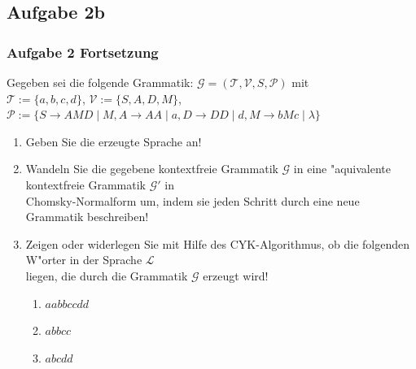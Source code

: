 
\subsection{Aufgabe 2b}
\begin{frame}
	\frametitle{Aufgabe 2 Fortsetzung}
	Gegeben sei die folgende Grammatik: $\mathcal{G} = (\mathcal{T},\mathcal{V},S,
	\mathcal{P})$ mit\\
	$\mathcal{T} := \{a,b,c,d\}$, $\mathcal{V} := \{S,A,D,M\}$, $\mathcal{P} := \{
	S \rightarrow AMD \; | \; M, A \rightarrow AA \; | \; a, D \rightarrow DD \; | \; d,
	M \rightarrow bMc \; | \; \lambda\}$
	\begin{enumerate}
		\item Geben Sie die erzeugte Sprache an!
		\item Wandeln Sie die gegebene kontextfreie Grammatik $\mathcal{G}$ in eine
		"aquivalente kontextfreie Grammatik $\mathcal{G}'$ in\\
		Chomsky-Normalform um, indem sie jeden Schritt durch eine neue Grammatik beschreiben!
		\item Zeigen oder widerlegen Sie mit Hilfe des CYK-Algorithmus, ob die folgenden
		W"orter in der Sprache $\mathcal{L}$\\
		liegen, die durch die Grammatik $\mathcal{G}$ erzeugt wird!
		\begin{enumerate}
			\item $aabbccdd$
			\item $abbcc$
			\item $abcdd$
		\end{enumerate}
	\end{enumerate}
\end{frame}

